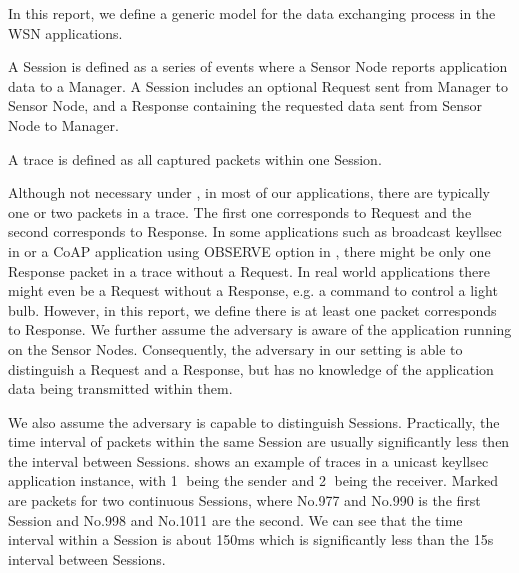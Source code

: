 In this report, we define a generic model for the data exchanging process in the WSN applications.

\begin{definition} \label{Def: Session}
A Session is defined as a series of events where a Sensor Node reports application data to a Manager. A Session includes an optional Request sent from Manager to Sensor Node, and a Response containing the requested data sent from Sensor Node to Manager.
\end{definition}

\begin{definition} \label{Def: Trace}
A trace is defined as all captured packets within one Session.
\end{definition}

Although not necessary under , in most of our applications, there are typically one or two packets in a trace. The first one corresponds to Request and the second corresponds to Response. In some applications such as broadcast keyllsec in  or a CoAP application using OBSERVE option in , there might be only one Response packet in a trace without a Request. In real world applications there might even be a Request without a Response, e.g. a command to control a light bulb. However, in this report, we define there is at least one packet corresponds to Response. We further assume the adversary is aware of the application running on the Sensor Nodes. Consequently, the adversary in our setting is able to distinguish a Request and a Response, but has no knowledge of the application data being transmitted within them.

We also assume the adversary is capable to distinguish Sessions. Practically, the time interval of packets within the same Session are usually significantly less then the interval between Sessions.  shows an example of traces in a unicast keyllsec application instance, with \textcircled{1} being the sender and \textcircled{2} being the receiver. Marked are packets for two continuous Sessions, where No.977 and No.990 is the first Session and No.998 and No.1011 are the second. We can see that the time interval within a Session is about 150ms which is significantly less than the 15s interval between Sessions.


